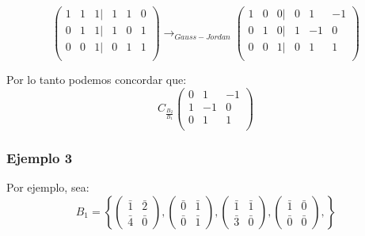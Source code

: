 \documentclass[12pt]{article}							    %
\begin{document}
\begin{equation*}
    \begin{pmatrix}
        1 & 1 & 1 | & 1 & 1 & 0 \\
        0 & 1 & 1 | & 1 & 0 & 1 \\
        0 & 0 & 1 | & 0 & 1 & 1 \\
    \end{pmatrix}
    \to_{Gauss-Jordan}
    \begin{pmatrix}
        1 & 0 & 0 | & 0 & 1 & -1 \\
        0 & 1 & 0 | & 1 & -1 & 0 \\
        0 & 0 & 1 | & 0 & 1 & 1 \\
    \end{pmatrix}
\end{equation*}

Por lo tanto podemos concordar que:
\begin{equation*}
    C_{\frac{B_2}{B_1}}
    \begin{pmatrix}
        0 & 1 & -1 \\
        1 & -1 & 0 \\
        0 & 1 & 1  \\
    \end{pmatrix}
\end{equation*}



\subsubsection{Ejemplo 3}

Por ejemplo, sea:
\begin{equation*}
    B_1 = \left\{
        \begin{pmatrix}\bar{1}&\bar{2}\\\bar{4}&\bar{0}\end{pmatrix},
        \begin{pmatrix}\bar{0}&\bar{1}\\\bar{0}&\bar{1}\end{pmatrix},
        \begin{pmatrix}\bar{1}&\bar{1}\\\bar{3}&\bar{0}\end{pmatrix},
        \begin{pmatrix}\bar{1}&\bar{0}\\\bar{0}&\bar{0}\end{pmatrix},
    \right\}
\end{equation*}
\end{document}
